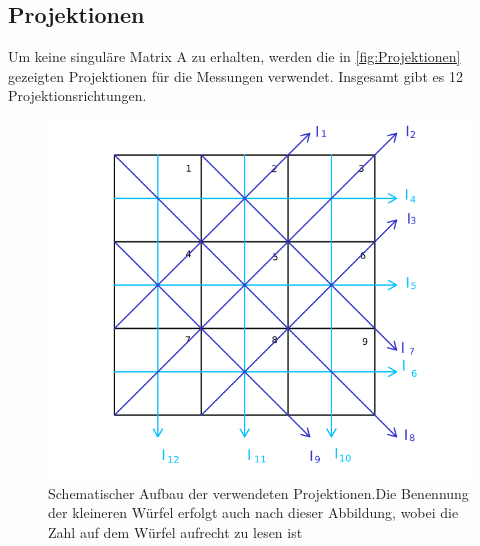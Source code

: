 \subsection{Projektionen}
Um keine singuläre Matrix A zu erhalten, werden die in \autoref{fig:Projektionen} gezeigten Projektionen für die Messungen verwendet.
Insgesamt gibt es 12 Projektionsrichtungen.

\begin{figure}[H]
    \centering
    \includegraphics[width=\textwidth]{bilder/projektionen.png}
    \caption{Schematischer Aufbau der verwendeten Projektionen.Die Benennung der kleineren Würfel erfolgt auch nach dieser Abbildung, wobei die Zahl auf dem Würfel aufrecht zu lesen ist}
    \label{fig:Projektionen}
\end{figure}

